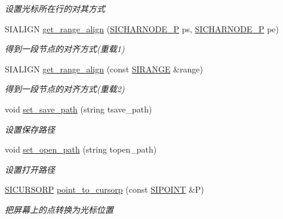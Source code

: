 \begin{DoxyCompactItemize}
\begin{DoxyCompactList}\small\item\em 设置光标所在行的对其方式 \end{DoxyCompactList}\item 
S\+I\+A\+L\+I\+GN \hyperlink{class_s_i_t_e_x_t_a43b43ba8dc025b49555f527734508465}{get\+\_\+range\+\_\+align} (\hyperlink{class_s_i_c_h_a_r_n_o_d_e}{S\+I\+C\+H\+A\+R\+N\+O\+D\+E\+\_\+P} ps, \hyperlink{class_s_i_c_h_a_r_n_o_d_e}{S\+I\+C\+H\+A\+R\+N\+O\+D\+E\+\_\+P} pe)
\begin{DoxyCompactList}\small\item\em 得到一段节点的对齐方式(重载1)~\newline
\end{DoxyCompactList}\item 
S\+I\+A\+L\+I\+GN \hyperlink{class_s_i_t_e_x_t_a53c41b86be047c49946fab50ef79563b}{get\+\_\+range\+\_\+align} (const \hyperlink{struct_s_i_r_a_n_g_e}{S\+I\+R\+A\+N\+GE} \&range)
\begin{DoxyCompactList}\small\item\em 得到一段节点的对齐方式(重载2) \end{DoxyCompactList}\item 
\mbox{\label{class_s_i_t_e_x_t_a150118dc911f012d521f64a54fbc05f5}} 
void \hyperlink{class_s_i_t_e_x_t_a150118dc911f012d521f64a54fbc05f5}{set\+\_\+save\+\_\+path} (string tsave\+\_\+path)
\begin{DoxyCompactList}\small\item\em 设置保存路径 \end{DoxyCompactList}\item 
\mbox{\label{class_s_i_t_e_x_t_aaf81d56b98488470fb9b7eba1f570d8e}} 
void \hyperlink{class_s_i_t_e_x_t_aaf81d56b98488470fb9b7eba1f570d8e}{set\+\_\+open\+\_\+path} (string topen\+\_\+path)
\begin{DoxyCompactList}\small\item\em 设置打开路径 \end{DoxyCompactList}\item 
\mbox{\label{class_s_i_t_e_x_t_a7855275742bfdd1634cdadaae7199c14}} 
\hyperlink{class_s_i_c_h_a_r_n_o_d_e}{S\+I\+C\+U\+R\+S\+O\+RP} \hyperlink{class_s_i_t_e_x_t_a7855275742bfdd1634cdadaae7199c14}{point\+\_\+to\+\_\+cursorp} (const \hyperlink{struct_s_i_p_o_i_n_t}{S\+I\+P\+O\+I\+NT} \&P)
\begin{DoxyCompactList}\small\item\em 把屏幕上的点转换为光标位置 \end{DoxyCompactList}\item 

\end{DoxyCompactItemize}
